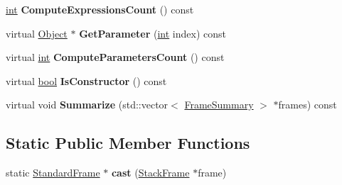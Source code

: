 \begin{DoxyCompactItemize}
\mbox{\hyperlink{classint}{int}} {\bfseries Compute\+Expressions\+Count} () const
\item 
\mbox{\label{classv8_1_1internal_1_1StandardFrame_a9f7680c034f6e2eba8324679e515d11b}} 
virtual \mbox{\hyperlink{classv8_1_1internal_1_1Object}{Object}} $\ast$ {\bfseries Get\+Parameter} (\mbox{\hyperlink{classint}{int}} index) const
\item 
\mbox{\label{classv8_1_1internal_1_1StandardFrame_a73f6ebeb27e85625d7e9382d21f1d450}} 
virtual \mbox{\hyperlink{classint}{int}} {\bfseries Compute\+Parameters\+Count} () const
\item 
\mbox{\label{classv8_1_1internal_1_1StandardFrame_a4ea472dfa8ae9372fb9f4c1ab81b4ef3}} 
virtual \mbox{\hyperlink{classbool}{bool}} {\bfseries Is\+Constructor} () const
\item 
\mbox{\label{classv8_1_1internal_1_1StandardFrame_aa7db025efa50e6650be631909eeddc9e}} 
virtual void {\bfseries Summarize} (std\+::vector$<$ \mbox{\hyperlink{classv8_1_1internal_1_1FrameSummary}{Frame\+Summary}} $>$ $\ast$frames) const
\end{DoxyCompactItemize}
\subsection*{Static Public Member Functions}
\begin{DoxyCompactItemize}
\item 
\mbox{\label{classv8_1_1internal_1_1StandardFrame_ac92588167f70de41f1eaefb2f8addc14}} 
static \mbox{\hyperlink{classv8_1_1internal_1_1StandardFrame}{Standard\+Frame}} $\ast$ {\bfseries cast} (\mbox{\hyperlink{classv8_1_1internal_1_1StackFrame}{Stack\+Frame}} $\ast$frame)
\end{DoxyCompactItemize}

